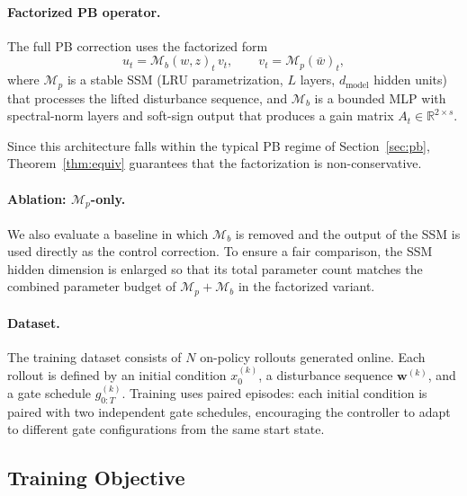 \documentclass[journal,twoside,web]{ieeecolor}
\begin{document}
\paragraph{Factorized PB operator.}
The full PB correction uses the factorized form
\begin{equation}
u_t = \mathcal{M}_b(w,z)_t\,v_t,
\qquad
v_t = \mathcal{M}_p(\bar{w})_t,
\label{eq:gate-factor}
\end{equation}
where \(\mathcal{M}_p\) is a stable SSM (LRU parametrization, \(L\) layers,
\(d_{\mathrm{model}}\) hidden units) that processes the lifted disturbance sequence, and
\(\mathcal{M}_b\) is a bounded MLP with spectral-norm layers and soft-sign output that produces
a gain matrix \(A_t\in\mathbb{R}^{2\times s}\).

Since this architecture falls within the typical PB regime of Section~\ref{sec:pb},
Theorem~\ref{thm:equiv} guarantees that the factorization is non-conservative.

\paragraph{Ablation: \(\mathcal{M}_p\)-only.}
We also evaluate a baseline in which \(\mathcal{M}_b\) is removed and the output of the SSM
is used directly as the control correction. To ensure a fair comparison, the SSM hidden
dimension is enlarged so that its total parameter count matches the combined parameter budget
of \(\mathcal{M}_p + \mathcal{M}_b\) in the factorized variant.

\paragraph{Dataset.}
The training dataset consists of \(N\) on-policy rollouts generated online. Each rollout is
defined by an initial condition \(x_0^{(k)}\), a disturbance sequence \(\mathbf{w}^{(k)}\),
and a gate schedule \(g_{0:T}^{(k)}\). Training uses paired episodes: each initial
condition is paired with two independent gate schedules, encouraging the controller to adapt
to different gate configurations from the same start state.

\subsection{Training Objective}
\label{subsec:gate-training}
\end{document}
